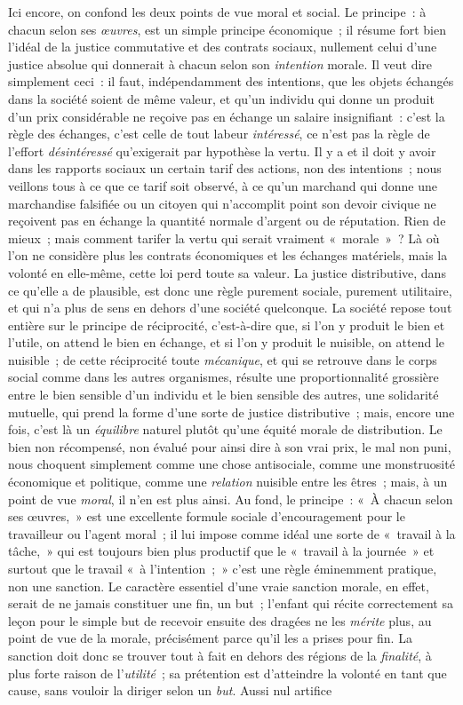 \documentclass[french,twoside]{book} %
\begin{document}
Ici encore, on confond les deux points de vue moral et social. Le principe : à chacun selon ses \emph{œuvres}, est un simple principe économique ; il résume fort bien l’idéal de la justice commutative et des contrats sociaux, nullement celui d’une justice absolue qui donnerait à chacun selon son \emph{intention} morale. Il veut dire simplement ceci : il faut, indépendamment des intentions, que les objets échangés dans la société soient de même valeur, et qu’un individu qui donne un produit d’un prix considérable ne reçoive pas en échange un salaire insignifiant : c’est la règle des échanges, c’est celle de tout labeur \emph{intéressé}, ce n’est pas la règle de l’effort \emph{désintéressé} qu’exigerait par hypothèse la vertu. Il y a et il doit y avoir dans les rapports sociaux un certain tarif des actions, non des intentions ; nous veillons tous à ce que ce tarif soit observé, à ce qu’un marchand qui donne une marchandise falsifiée ou un citoyen qui n’accomplit point son devoir civique ne reçoivent pas en échange la quantité normale d’argent ou de réputation. Rien de mieux ; mais comment tarifer la vertu qui serait vraiment « morale » ? Là où l’on ne considère plus les contrats économiques et les échanges matériels, mais la volonté en elle-même, cette loi perd toute sa valeur. La justice distributive, dans ce qu’elle a de plausible, est donc une règle purement sociale, purement utilitaire, et qui n’a plus de sens en dehors d’une société quelconque. La société repose tout entière sur le principe de réciprocité, c’est-à-dire que, si l’on y produit le bien et l’utile, on attend le bien en échange, et si l’on y produit le nuisible, on attend le nuisible ; de cette réciprocité toute \emph{mécanique}, et qui se retrouve dans le corps social comme dans les autres organismes, résulte une proportionnalité grossière entre le bien sensible d’un individu et le bien sensible des autres, une solidarité mutuelle, qui prend la forme d’une sorte de justice distributive ; mais, encore une fois, c’est là un \emph{équilibre} naturel plutôt qu’une équité morale de distribution. Le bien non récompensé, non évalué pour ainsi dire à son vrai prix, le mal non puni, nous choquent simplement comme une chose antisociale, comme une monstruosité économique et politique, comme une \emph{relation} nuisible entre les êtres ; mais, à un point de vue \emph{moral}, il n’en est plus ainsi. Au fond, le principe : « À chacun selon ses œuvres, » est une excellente formule sociale d’encouragement pour le travailleur ou l’agent moral ; il lui impose comme idéal une sorte de « travail à la tâche, » qui est toujours bien plus productif que le « travail à la journée » et surtout que le travail « à l’intention ; » c’est une règle éminemment pratique, non une sanction. Le caractère essentiel d’une vraie sanction morale, en effet, serait de ne jamais constituer une fin, un but ; l’enfant qui récite correctement sa leçon pour le simple but de recevoir ensuite des dragées ne les \emph{mérite} plus, au point de vue de la morale, précisément parce qu’il les a prises pour fin. La sanction doit donc se trouver tout à fait en dehors des régions de la \emph{finalité}, à plus forte raison de l’\emph{utilité} ; sa prétention est d’atteindre la volonté en tant que cause, sans vouloir la diriger selon un \emph{but}. Aussi nul artifice 
\end{document}
